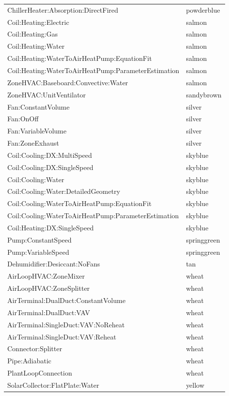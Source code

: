 \begin{longtable}[c]{@{}ll@{}}
ChillerHeater:Absorption:DirectFired & powderblue \tabularnewline
Coil:Heating:Electric & salmon \tabularnewline
Coil:Heating:Gas & salmon \tabularnewline
Coil:Heating:Water & salmon \tabularnewline
Coil:Heating:WaterToAirHeatPump:EquationFit & salmon \tabularnewline
Coil:Heating:WaterToAirHeatPump:ParameterEstimation & salmon \tabularnewline
ZoneHVAC:Baseboard:Convective:Water & salmon \tabularnewline
ZoneHVAC:UnitVentilator & sandybrown \tabularnewline
Fan:ConstantVolume & silver \tabularnewline
Fan:OnOff & silver \tabularnewline
Fan:VariableVolume & silver \tabularnewline
Fan:ZoneExhaust & silver \tabularnewline
Coil:Cooling:DX:MultiSpeed & skyblue \tabularnewline
Coil:Cooling:DX:SingleSpeed & skyblue \tabularnewline
Coil:Cooling:Water & skyblue \tabularnewline
Coil:Cooling:Water:DetailedGeometry & skyblue \tabularnewline
Coil:Cooling:WaterToAirHeatPump:EquationFit & skyblue \tabularnewline
Coil:Cooling:WaterToAirHeatPump:ParameterEstimation & skyblue \tabularnewline
Coil:Heating:DX:SingleSpeed & skyblue \tabularnewline
Pump:ConstantSpeed & springgreen \tabularnewline
Pump:VariableSpeed & springgreen \tabularnewline
Dehumidifier:Desiccant:NoFans & tan \tabularnewline
AirLoopHVAC:ZoneMixer & wheat \tabularnewline
AirLoopHVAC:ZoneSplitter & wheat \tabularnewline
AirTerminal:DualDuct:ConstantVolume & wheat \tabularnewline
AirTerminal:DualDuct:VAV & wheat \tabularnewline
AirTerminal:SingleDuct:VAV:NoReheat & wheat \tabularnewline
AirTerminal:SingleDuct:VAV:Reheat & wheat \tabularnewline
Connector:Splitter & wheat \tabularnewline
Pipe:Adiabatic & wheat \tabularnewline
PlantLoopConnection & wheat \tabularnewline
SolarCollector:FlatPlate:Water & yellow \tabularnewline
\bottomrule
\end{longtable}
